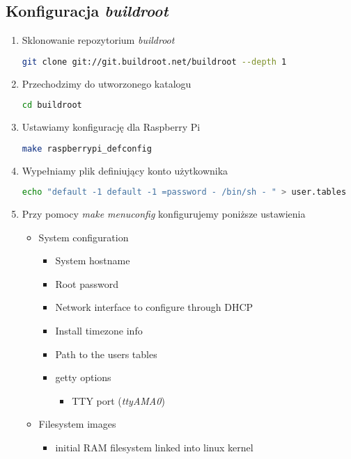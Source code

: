 \subsection{Konfiguracja \emph{buildroot}}
\begin{enumerate}
	\item Sklonowanie repozytorium \emph{buildroot}
	\begin{lstlisting}[language=bash]
	git clone git://git.buildroot.net/buildroot --depth 1
	\end{lstlisting}
	\item Przechodzimy do utworzonego katalogu
	\begin{lstlisting}[language=bash]
	cd buildroot
	\end{lstlisting}	
	\item Ustawiamy konfigurację dla Raspberry Pi
	\begin{lstlisting}[language=bash]
	make raspberrypi_defconfig
	\end{lstlisting}	
	\item Wypełniamy plik definiujący konto użytkownika
	\begin{lstlisting}[language=bash]
	echo "default -1 default -1 =password - /bin/sh - " > user.tables
	\end{lstlisting}		
	\item Przy pomocy \emph{make menuconfig}
	konfigurujemy poniższe ustawienia\\
	\begin{itemize}	
		\item System configuration
		\begin{itemize}
			\item System hostname
			\item Root password
			\item Network interface to configure through DHCP
			\item Install timezone info
			\item Path to the users tables
			\item getty options 
			\begin{itemize}
				\item TTY port (\emph{ttyAMA0})
			\end{itemize}
		\end{itemize}
		\item Filesystem images
		\begin{itemize}
			\item initial RAM filesystem linked into linux kernel
		\end{itemize}

\end{itemize}
\end{enumerate}
